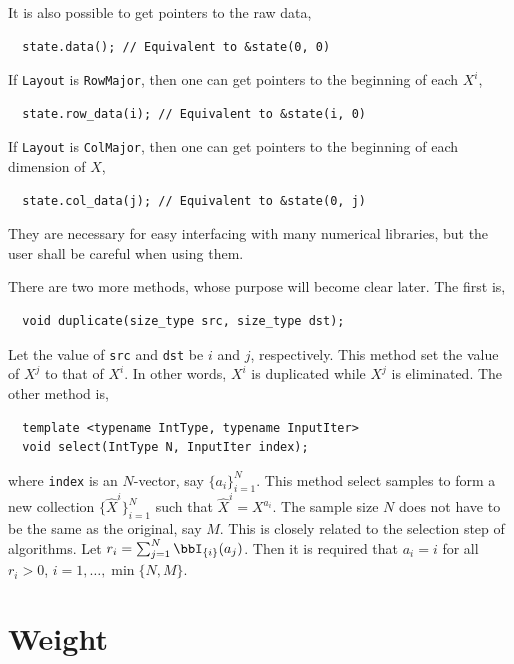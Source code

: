 It is also possible to get pointers to the raw data,
\begin{Verbatim}
  state.data(); // Equivalent to &state(0, 0)
\end{Verbatim}
If \verb|Layout| is \verb|RowMajor|, then one can get pointers to the beginning
of each $X^i$,
\begin{Verbatim}
  state.row_data(i); // Equivalent to &state(i, 0)
\end{Verbatim}
If \verb|Layout| is \verb|ColMajor|, then one can get pointers to the beginning
of each dimension of $X$,
\begin{Verbatim}
  state.col_data(j); // Equivalent to &state(0, j)
\end{Verbatim}
They are necessary for easy interfacing with many numerical libraries, but the
user shall be careful when using them.

There are two more methods, whose purpose will become clear later. The first
is,
\begin{Verbatim}
  void duplicate(size_type src, size_type dst);
\end{Verbatim}
Let the value of \verb|src| and \verb|dst| be $i$ and $j$, respectively. This
method set the value of $X^j$ to that of $X^i$. In other words, $X^i$ is
duplicated while $X^j$ is eliminated. The other method is,
\begin{Verbatim}
  template <typename IntType, typename InputIter>
  void select(IntType N, InputIter index);
\end{Verbatim}
where \verb|index| is an $N$-vector, say $\{a_i\}_{i=1}^N$. This method select
samples to form a new collection $\{\hat{X}^i\}_{i=1}^N$ such that $\hat{X}^i =
X^{a_i}$. The sample size $N$ does not have to be the same as the original, say
$M$. This is closely related to the selection step of \smc algorithms. Let $r_i
= \sum_{j = 1}^N\bbI_{\{i\}}(a_j)$. Then it is required that $a_i = i$ for all
$r_i > 0$, $i = 1,\dots,\min\{N, M\}$.

\section{Weight}
\label{sec:Weight}

